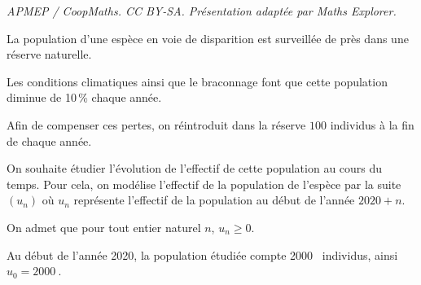 \documentclass[10pt]{article}
\providecommand{\np}[2][]{{#2~#1}}
\begin{document}
\noindent\textit{APMEP / CoopMaths. CC BY-SA. Présentation adaptée par Maths Explorer.}\par\medskip
\medskip

La population d'une espèce en voie de disparition est surveillée de près dans une réserve naturelle.

Les conditions climatiques ainsi que le braconnage font que cette population diminue de 10\,\% chaque année.

Afin de compenser ces pertes, on réintroduit dans la réserve $100$ individus à la fin de chaque année.

On souhaite étudier l'évolution de l'effectif de cette population au cours du temps. Pour cela, on modélise l'effectif de la population de l'espèce par la suite $\left(u_n\right)$ où $u_n$ représente l'effectif de la population au début de l'année $2020 + n$. 

On admet que pour tout entier naturel $n$,\: $u_n \geqslant 0$.

Au début de l'année 2020, la population étudiée compte \np{2000} individus, ainsi $u_0 = \np{2000}$.

\medskip
\end{document}
